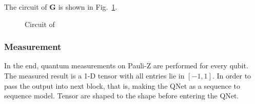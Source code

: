 The circuit of $\mathbf{G}$ is shown in Fig.~\ref{fig:g-operator}.

\begin{figure}[htp!]
  \centering
  \caption{Circuit of }
  \label{fig:g-operator}
\end{figure}

\subsubsection{Measurement}
In the end, quantum measurements on Pauli-Z are performed for every qubit. The measured result is a 1-D tensor with all entries lie in $[-1, 1]$. In order to pass the output into next block, that is, making the QNet as a sequence to sequence model. Tensor are shaped to the shape before entering the QNet.
